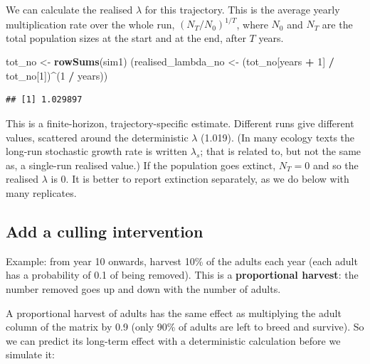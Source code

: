 \documentclass[
  a4paper]{book}
\newenvironment{Shaded}{\begin{snugshade}}{\end{snugshade}}
\newcommand{\DecValTok}[1]{\textcolor[rgb]{0.00,0.00,0.81}{#1}}
\newcommand{\FloatTok}[1]{\textcolor[rgb]{0.00,0.00,0.81}{#1}}
\newcommand{\FunctionTok}[1]{\textcolor[rgb]{0.13,0.29,0.53}{\textbf{#1}}}
\newcommand{\NormalTok}[1]{#1}
\newcommand{\OtherTok}[1]{\textcolor[rgb]{0.56,0.35,0.01}{#1}}
\newcommand{\SpecialCharTok}[1]{\textcolor[rgb]{0.81,0.36,0.00}{\textbf{#1}}}
\newcommand{\StringTok}[1]{\textcolor[rgb]{0.31,0.60,0.02}{#1}}
\begin{document}
We can calculate the realised \(\lambda\) for this trajectory. This is the average yearly multiplication rate over the whole run, \((N_T / N_0)^{1/T}\), where \(N_0\) and \(N_T\) are the total population sizes at the start and at the end, after \(T\) years.

\begin{Shaded}
\begin{Highlighting}[]
\NormalTok{tot\_no }\OtherTok{\textless{}{-}} \FunctionTok{rowSums}\NormalTok{(sim1)}
\NormalTok{(realised\_lambda\_no }\OtherTok{\textless{}{-}}\NormalTok{ (tot\_no[years }\SpecialCharTok{+} \DecValTok{1}\NormalTok{] }\SpecialCharTok{/}\NormalTok{ tot\_no[}\DecValTok{1}\NormalTok{])}\SpecialCharTok{\^{}}\NormalTok{(}\DecValTok{1} \SpecialCharTok{/}\NormalTok{ years))}
\end{Highlighting}
\end{Shaded}

\begin{verbatim}
## [1] 1.029897
\end{verbatim}

This is a finite-horizon, trajectory-specific estimate. Different runs give different values, scattered around the deterministic \(\lambda\) (1.019). (In many ecology texts the long-run stochastic growth rate is written \(\lambda_s\); that is related to, but not the same as, a single-run realised value.) If the population goes extinct, \(N_T = 0\) and so the realised \(\lambda\) is 0. It is better to report extinction separately, as we do below with many replicates.

\subsection{Add a culling intervention}\label{add-a-culling-intervention}

Example: from year 10 onwards, harvest 10\% of the adults each year (each adult has a probability of 0.1 of being removed). This is a \textbf{proportional harvest}: the number removed goes up and down with the number of adults.

A proportional harvest of adults has the same effect as multiplying the adult column of the matrix by 0.9 (only 90\% of adults are left to breed and survive). So we can predict its long-term effect with a deterministic calculation before we simulate it:

\begin{Shaded}
\end{Shaded}
\end{document}
